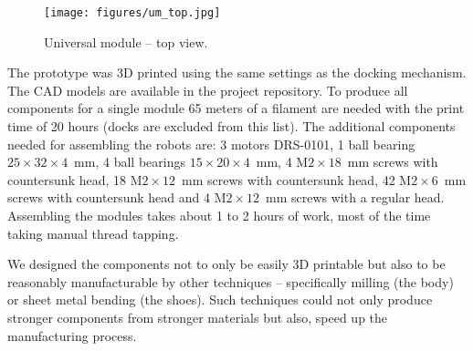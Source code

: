 \begin{figure}[!t]
    \centering
    \texttt{[image: figures/um\_top.jpg]}
    \caption{Universal module -- top view.}
    \label{fig:um_photo_top}
\end{figure}

The prototype was 3D printed using the same settings as the docking mechanism.
The CAD models are available in the project repository. To produce all
components for a single module 65 meters of a filament are needed with the print
time of 20 hours (docks are excluded from this list). The additional components
needed for assembling the robots are: 3 motors DRS-0101, 1 ball bearing
$25\times32\times4$~mm, 4 ball bearings $15\times20\times4$~mm, 4
M$2\times18$~mm screws with countersunk head, 18 M$2\times12$~mm screws with
countersunk head, 42 M$2\times6$~mm screws with countersunk head and 4
M$2\times12$~mm screws with a regular head. Assembling the modules takes about 1
to 2 hours of work, most of the time taking manual thread tapping.

We designed the components not to only be easily 3D printable but also to be
reasonably manufacturable by other techniques -- specifically milling (the body)
or sheet metal bending (the shoes). Such techniques could not only produce
stronger components from stronger materials but also, speed up the
manufacturing process.
